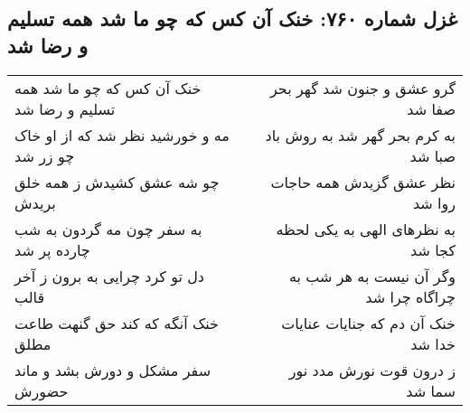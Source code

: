 \begin{center}
\section*{غزل شماره ۷۶۰: خنک آن کس که چو ما شد همه تسلیم و رضا شد}
\label{sec:0760}
\begin{longtable}{l p{0.5cm} r}
خنک آن کس که چو ما شد همه تسلیم و رضا شد
&&
گرو عشق و جنون شد گهر بحر صفا شد
\\
مه و خورشید نظر شد که از او خاک چو زر شد
&&
به کرم بحر گهر شد به روش باد صبا شد
\\
چو شه عشق کشیدش ز همه خلق بریدش
&&
نظر عشق گزیدش همه حاجات روا شد
\\
به سفر چون مه گردون به شب چارده پر شد
&&
به نظرهای الهی به یکی لحظه کجا شد
\\
دل تو کرد چرایی به برون ز آخر قالب
&&
وگر آن نیست به هر شب به چراگاه چرا شد
\\
خنک آنگه که کند حق گنهت طاعت مطلق
&&
خنک آن دم که جنایات عنایات خدا شد
\\
سفر مشکل و دورش بشد و ماند حضورش
&&
ز درون قوت نورش مدد نور سما شد
\\
\end{longtable}
\end{center}
